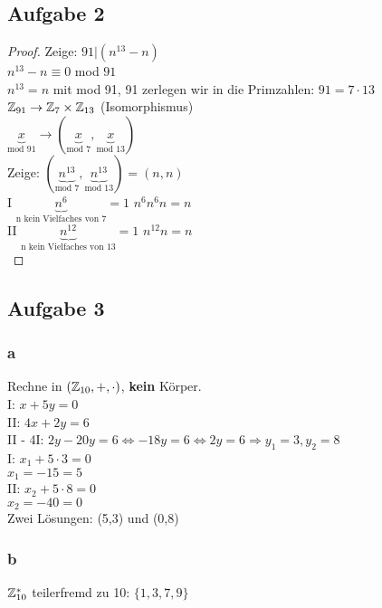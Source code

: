 \subsection{Aufgabe 2}

\begin{proof}
Zeige: $91 | (n^{13}-n)$\\
$n^{13}-n \equiv 0$ mod $91$\\
$n^{13}=n$ mit mod 91, 91 zerlegen wir in die Primzahlen: $91=7\cdot 13$\\
$\mathbb{Z}_{91} \rightarrow \mathbb{Z}_7 \times \mathbb{Z}_{13}$ (Isomorphismus)\\
$\underbrace{x}_{\textrm{mod 91}} \rightarrow (\underbrace{x}_{\textrm{mod 7}},\underbrace{x}_{\textrm{mod 13}})$\\
Zeige: $(\underbrace{n^{13}}_{\textrm{mod 7}},\underbrace{n^{13}}_{\textrm{mod 13}})=(n,n)$\\
I $\underbrace{n^6}_{\textrm{n kein Vielfaches von 7}}=1$ $n^6 n^6 n = n$\\
II $\underbrace{n^{12}}_{\textrm{n kein Vielfaches von 13}}=1$ $n^{12} n = n $\\
\end{proof}

\subsection{Aufgabe 3}

\subsubsection{a} Rechne in $(\mathbb{Z}_{10},+,\cdot)$, \textbf{kein} Körper.\\
I: $x+5y=0$\\
II: $4x+2y=6$\\
II - 4I: $2y-20y=6 \Leftrightarrow -18y=6 \Leftrightarrow 2y=6 \Rightarrow y_1=3, y_2=8$\\
I: $x_1+5\cdot 3=0$\\
$x_1=-15=5$\\

II: $x_2+5\cdot 8=0$\\
$x_2=-40=0$\\
Zwei Lösungen: (5,3) und (0,8)

\subsubsection{b} $\mathbb{Z}_{10}^* $ teilerfremd zu 10: $\{1,3,7,9\}$\\

